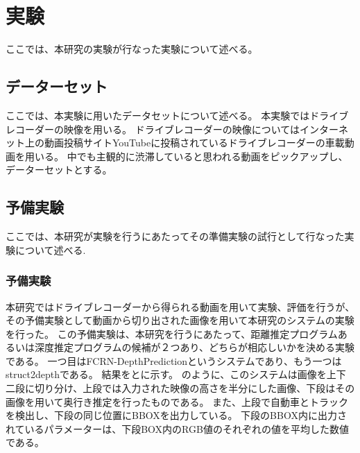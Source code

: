 \chapter{実験}
ここでは、本研究の実験が行なった実験について述べる。

\section{データーセット}
ここでは、本実験に用いたデータセットについて述べる。
本実験ではドライブレコーダーの映像を用いる。
ドライブレコーダーの映像についてはインターネット上の動画投稿サイトYouTubeに投稿されているドライブレコーダーの車載動画を用いる。
中でも主観的に渋滞していると思われる動画をピックアップし、データーセットとする。

\section{予備実験}
ここでは、本研究が実験を行うにあたってその準備実験の試行として行なった実験について述べる.



\subsection{予備実験}
本研究ではドライブレコーダーから得られる動画を用いて実験、評価を行うが、その予備実験として動画から切り出された画像を用いて本研究のシステムの実験を行った。
この予備実験は、本研究を行うにあたって、距離推定プログラムあるいは深度推定プログラムの候補が２つあり、どちらが相応しいかを決める実験である。
一つ目はFCRN-DepthPrediction\cite{laina2016deeper}というシステムであり、もう一つはstruct2depthである。
結果をとに示す。
のように、このシステムは画像を上下二段に切り分け、上段では入力された映像の高さを半分にした画像、下段はその画像を用いて奥行き推定を行ったものである。
また、上段で自動車とトラックを検出し、下段の同じ位置にBBOXを出力している。
下段のBBOX内に出力されているパラメーターは、下段BOX内のRGB値のそれぞれの値を平均した数値である。

